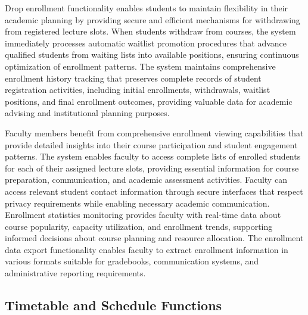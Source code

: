Drop enrollment functionality enables students to maintain flexibility in their academic planning by providing secure and efficient mechanisms for withdrawing from registered lecture slots. When students withdraw from courses, the system immediately processes automatic waitlist promotion procedures that advance qualified students from waiting lists into available positions, ensuring continuous optimization of enrollment patterns. The system maintains comprehensive enrollment history tracking that preserves complete records of student registration activities, including initial enrollments, withdrawals, waitlist positions, and final enrollment outcomes, providing valuable data for academic advising and institutional planning purposes.

Faculty members benefit from comprehensive enrollment viewing capabilities that provide detailed insights into their course participation and student engagement patterns. The system enables faculty to access complete lists of enrolled students for each of their assigned lecture slots, providing essential information for course preparation, communication, and academic assessment activities. Faculty can access relevant student contact information through secure interfaces that respect privacy requirements while enabling necessary academic communication. Enrollment statistics monitoring provides faculty with real-time data about course popularity, capacity utilization, and enrollment trends, supporting informed decisions about course planning and resource allocation. The enrollment data export functionality enables faculty to extract enrollment information in various formats suitable for gradebooks, communication systems, and administrative reporting requirements.

\subsection{Timetable and Schedule Functions}

